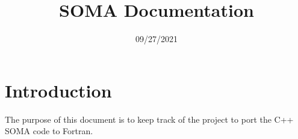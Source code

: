 \documentclass[12pt]{article}
\begin{document}
    \title{SOMA Documentation}
    \date{09/27/2021}
    \maketitle

    \section{Introduction}
        The purpose of this document is to keep track of the project to port the C++ SOMA code to Fortran.
\end{document}
